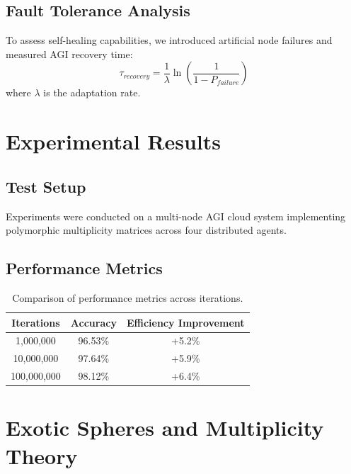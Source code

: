 \documentclass{article}
\theoremstyle{plain}
\begin{document}
\subsection{Fault Tolerance Analysis}
To assess self-healing capabilities, we introduced artificial node failures and measured AGI recovery time:
\begin{equation}
    \tau_{recovery} = \frac{1}{\lambda} \ln \left( \frac{1}{1 - P_{failure}} \right)
\end{equation}
where \(\lambda\) is the adaptation rate. 

\section{Experimental Results}

\subsection{Test Setup}
Experiments were conducted on a multi-node AGI cloud system implementing polymorphic multiplicity matrices across four distributed agents.

\subsection{Performance Metrics}
\begin{table}[h]
    \centering
    \begin{tabular}{|c|c|c|}
        \hline
        Iterations & Accuracy & Efficiency Improvement \\ \hline
        1,000,000 & 96.53\% & +5.2\% \\
        10,000,000 & 97.64\% & +5.9\% \\
        100,000,000 & 98.12\% & +6.4\% \\
        \hline
    \end{tabular}
    \caption{Comparison of performance metrics across iterations.}
    \label{tab:performance}
\end{table}
\section{Exotic Spheres and Multiplicity Theory}
\end{document}
